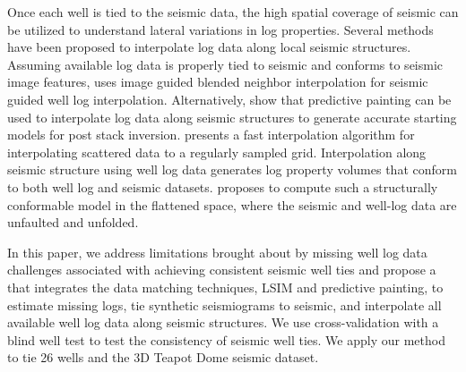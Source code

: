 Once each well is tied to the seismic data, the high spatial coverage of seismic can be utilized to understand lateral variations in log properties. Several methods have been proposed to interpolate log data along local seismic structures. Assuming available log data is properly tied to seismic and conforms to seismic image features, \cite{hale2010image} uses image guided blended neighbor interpolation \cite[]{hale2009image} for seismic guided well log interpolation. Alternatively, \cite{karimi2015image} show that predictive painting \cite[]{fomel2010predictive} can be used to interpolate log data along seismic structures to generate accurate starting models for post stack inversion. \cite{fomel2016scattered} presents a fast interpolation algorithm for interpolating scattered data to a regularly sampled grid. Interpolation along seismic structure using well log data generates log property volumes that conform to both well log and seismic datasets. \cite{wu2017models} proposes to compute such a structurally conformable model in the flattened space, where the seismic and well-log data are unfaulted and unfolded.

In this paper, we address limitations brought about by missing well log data  challenges associated with achieving consistent seismic well ties and propose a  that integrates the data matching techniques, LSIM and predictive painting, to estimate missing logs, tie synthetic seismiograms to seismic, and  interpolate all available well log data along seismic structures. We use cross-validation with a blind well test to test the consistency of seismic well ties. We apply our method to tie 26 wells and the 3D Teapot Dome seismic dataset.


